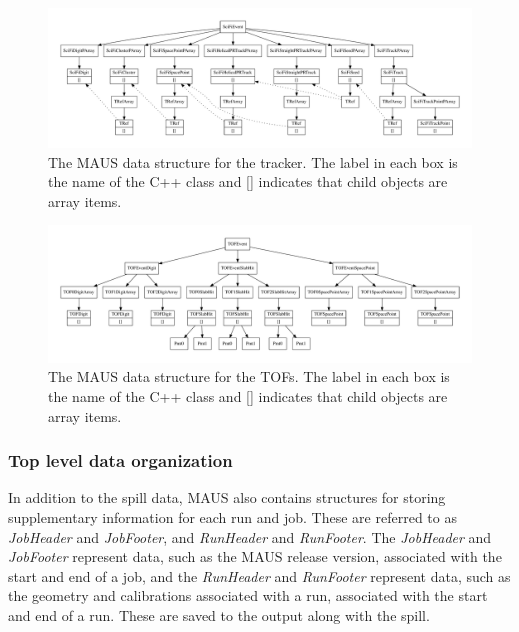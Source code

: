 \documentclass[11pt,a4paper]{article}
\begin{document}
\begin{figure}[ptb]
\centering
\includegraphics[width=1.0\textheight,angle=90,origin=c]{figs/scifi_datastructure.pdf}
\caption{The MAUS data structure for the tracker. The label in each box is the name of the C++ class and []  indicates that child objects are array items.}
\label{fig:datastructure-recon-scifi}
\end{figure}

\begin{figure}[ptb]
\centering
\includegraphics[width=1.0\textheight,angle=90,origin=c]{figs/tof_datastructure.pdf}
\caption{The MAUS data structure for the TOFs. The label in each box is the name of the C++ class and [] indicates that child objects are array items.}
\label{fig:datastructure-recon-tof}
\end{figure}

\FloatBarrier

\subsubsection{Top level data organization} \label{sec:top-level-datastr}

In addition to the spill data, MAUS also contains structures for storing supplementary information for each run and job. These are referred to as \emph{JobHeader} and \emph{JobFooter}, and \emph{RunHeader} and \emph{RunFooter}. The \emph{JobHeader} and \emph{JobFooter} represent data, such as the MAUS release version, associated with the start and end of a job, and the \emph{RunHeader} and \emph{RunFooter} represent data, such as the geometry and calibrations associated with a run, associated with the start and end of a run. These are saved to the output along with the spill.
\end{document}
